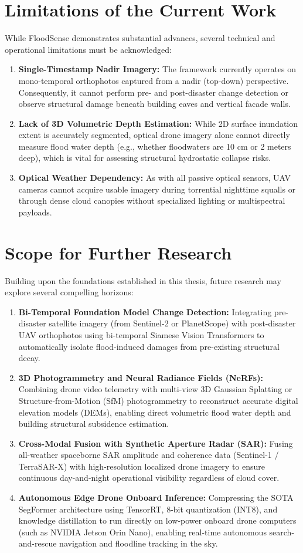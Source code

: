 \section{Limitations of the Current Work}
While FloodSense demonstrates substantial advances, several technical and operational limitations must be acknowledged:
\begin{enumerate}
    \item \textbf{Single-Timestamp Nadir Imagery:} The framework currently operates on mono-temporal orthophotos captured from a nadir (top-down) perspective. Consequently, it cannot perform pre- and post-disaster change detection or observe structural damage beneath building eaves and vertical facade walls.
    \item \textbf{Lack of 3D Volumetric Depth Estimation:} While 2D surface inundation extent is accurately segmented, optical drone imagery alone cannot directly measure flood water depth (e.g., whether floodwaters are 10 cm or 2 meters deep), which is vital for assessing structural hydrostatic collapse risks.
    \item \textbf{Optical Weather Dependency:} As with all passive optical sensors, UAV cameras cannot acquire usable imagery during torrential nighttime squalls or through dense cloud canopies without specialized lighting or multispectral payloads.
\end{enumerate}

\section{Scope for Further Research}
Building upon the foundations established in this thesis, future research may explore several compelling horizons:
\begin{enumerate}
    \item \textbf{Bi-Temporal Foundation Model Change Detection:} Integrating pre-disaster satellite imagery (from Sentinel-2 or PlanetScope) with post-disaster UAV orthophotos using bi-temporal Siamese Vision Transformers to automatically isolate flood-induced damages from pre-existing structural decay.
    \item \textbf{3D Photogrammetry and Neural Radiance Fields (NeRFs):} Combining drone video telemetry with multi-view 3D Gaussian Splatting or Structure-from-Motion (SfM) photogrammetry to reconstruct accurate digital elevation models (DEMs), enabling direct volumetric flood water depth and building structural subsidence estimation.
    \item \textbf{Cross-Modal Fusion with Synthetic Aperture Radar (SAR):} Fusing all-weather spaceborne SAR amplitude and coherence data (Sentinel-1 / TerraSAR-X) with high-resolution localized drone imagery to ensure continuous day-and-night operational visibility regardless of cloud cover.
    \item \textbf{Autonomous Edge Drone Onboard Inference:} Compressing the SOTA SegFormer architecture using TensorRT, 8-bit quantization (INT8), and knowledge distillation to run directly on low-power onboard drone computers (such as NVIDIA Jetson Orin Nano), enabling real-time autonomous search-and-rescue navigation and floodline tracking in the sky.
\end{enumerate}
